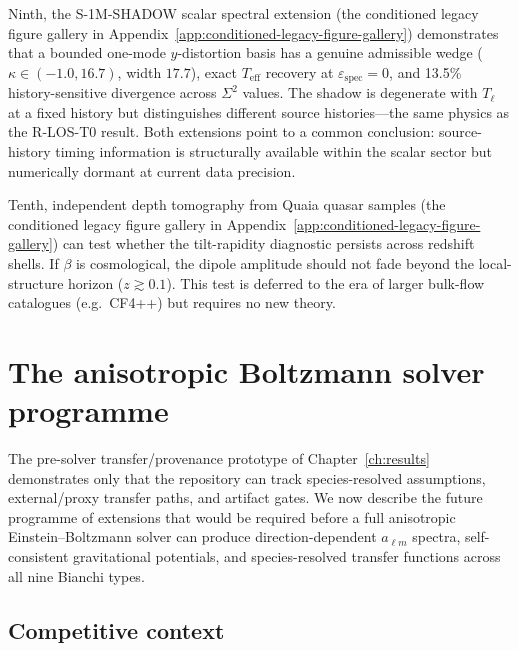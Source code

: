 Ninth, the S-1M-SHADOW scalar spectral extension
(the conditioned legacy figure gallery in Appendix~\ref{app:conditioned-legacy-figure-gallery}) demonstrates that a bounded
one-mode $y$-distortion basis has a genuine admissible wedge
($\kappa \in (-1.0, 16.7)$, width $17.7$), exact $T_\mathrm{eff}$
recovery at $\varepsilon_{\mathrm{spec}} = 0$, and 13.5\%
history-sensitive divergence across $\Sigma^2$ values.  The shadow
is degenerate with $T_\ell$ at a fixed history but distinguishes
different source histories---the same physics as the R-LOS-T0
result.  Both extensions point to a common conclusion:
source-history timing information is structurally available within
the scalar sector but numerically dormant at current data precision.

Tenth, independent depth tomography from Quaia quasar samples
(the conditioned legacy figure gallery in Appendix~\ref{app:conditioned-legacy-figure-gallery}) can test whether the
tilt-rapidity diagnostic persists across redshift shells.  If
$\beta$ is cosmological, the dipole amplitude should not fade
beyond the local-structure horizon ($z \gtrsim 0.1$).  This test
is deferred to the era of larger bulk-flow catalogues (e.g.\ CF4++)
but requires no new theory.




\section{The anisotropic Boltzmann solver programme}
\label{sec:solver-programme-ch9}

The pre-solver transfer/provenance prototype of
Chapter~\ref{ch:results} demonstrates only that the repository
can track species-resolved assumptions, external/proxy transfer
paths, and artifact gates.  We now describe the future programme
of extensions that would be required before a full anisotropic
Einstein--Boltzmann solver can produce direction-dependent $a_{\ell m}$
spectra, self-consistent gravitational potentials, and
species-resolved transfer functions across all nine
Bianchi types.


\subsection{Competitive context}
\label{sec:competitive}

